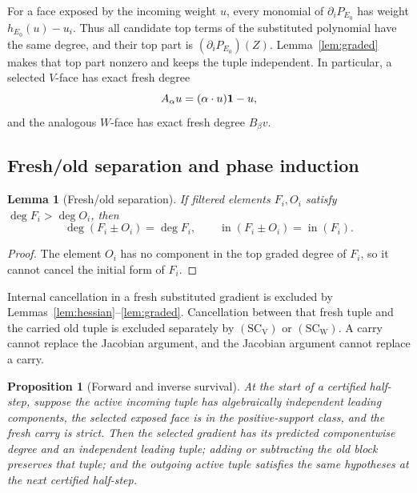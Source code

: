 \documentclass[11pt]{article}
\newtheorem{proposition}[theorem]{Proposition}
\newtheorem{lemma}[theorem]{Lemma}
\theoremstyle{definition}
\theoremstyle{remark}
\begin{document}
For a face exposed by the incoming weight \(u\), every monomial of
\(\partial_iP_{E_0}\) has weight \(h_{E_0}(u)-u_i\).  Thus all candidate
top terms of the substituted polynomial have the same degree, and their
top part is \((\partial_iP_{E_0})(Z)\).  Lemma~\ref{lem:graded} makes that
top part nonzero and keeps the tuple independent.  In particular, a
selected \(V\)-face has exact fresh degree
\[
 A_\alpha u=(\alpha\cdot u)\mathbf{1}-u,
\]
and the analogous \(W\)-face has exact fresh degree \(B_\beta v\).

\subsection{Fresh/old separation and phase induction}

\begin{lemma}[Fresh/old separation]
\label{lem:fresh-old}
If filtered elements \(F_i,O_i\) satisfy
\(\deg F_i>\deg O_i\), then
\[
 \deg(F_i\pm O_i)=\deg F_i,\qquad
 \operatorname{in}(F_i\pm O_i)=\operatorname{in}(F_i).
\tag{4.6}
\]
\end{lemma}

\begin{proof}
The element \(O_i\) has no component in the top graded degree of \(F_i\),
so it cannot cancel the initial form of \(F_i\).
\end{proof}

Internal cancellation in a fresh substituted gradient is excluded by
Lemmas~\ref{lem:hessian}--\ref{lem:graded}.  Cancellation between that
fresh tuple and the carried old tuple is excluded separately by
\(\mathrm{(SC_V)}\) or \(\mathrm{(SC_W)}\).  A carry cannot replace the
Jacobian argument, and the Jacobian argument cannot replace a carry.

\begin{proposition}[Forward and inverse survival]
\label{prop:survival}
At the start of a certified half-step, suppose the active incoming tuple has
algebraically independent leading components, the selected exposed face is
in the positive-support class, and the fresh carry is strict.  Then the
selected gradient has its predicted componentwise degree and an independent
leading tuple; adding or subtracting the old block preserves that tuple;
and the outgoing active tuple satisfies the same hypotheses at the next
certified half-step.
\end{proposition}
\end{document}
